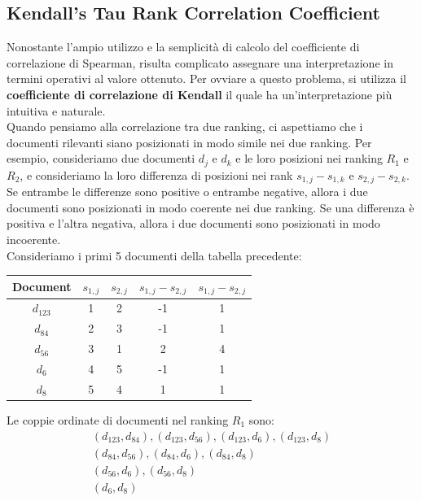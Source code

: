 \documentclass{report}
\begin{document}
	\subsection{Kendall's Tau Rank Correlation Coefficient}
	Nonostante l'ampio utilizzo e la semplicità di calcolo del coefficiente di correlazione di Spearman, risulta complicato assegnare una interpretazione in termini operativi al valore ottenuto. Per ovviare a questo problema, si utilizza il \textbf{coefficiente di correlazione di Kendall} il quale ha un'interpretazione più intuitiva e naturale.
	\vspace{\baselineskip}\\
	Quando pensiamo alla correlazione tra due ranking, ci aspettiamo che i documenti rilevanti siano posizionati in modo simile nei due ranking. Per esempio, consideriamo due documenti $d_j$ e $d_k$ e le loro posizioni nei ranking $R_1$ e $R_2$, e consideriamo la loro differenza di posizioni nei rank $s_{1,j} - s_{1,k}$ e $s_{2,j} - s_{2,k}$. Se entrambe le differenze sono positive o entrambe negative, allora i due documenti sono posizionati in modo coerente nei due ranking. Se una differenza è positiva e l'altra negativa, allora i due documenti sono posizionati in modo incoerente. 
	\vspace{\baselineskip}\\
	Consideriamo i primi 5 documenti della tabella precedente:
	\begin{table}
		\centering
		\begin{tabular}{|c|c|c|c|c|}
			\hline
			\textbf{Document} & \textbf{$s_{1,j}$} & \textbf{$s_{2,j}$} & \textbf{$s_{1,j} - s_{2,j}$} & \textbf{$s_{1,j} - s_{2,j}$}\\ 
			\hline
			$d_123$ & 1 & 2 & -1 & 1\\
			$d_84$ & 2 & 3 & -1 & 1\\
			$d_56$ & 3 & 1 & 2 & 4\\
			$d_6$ & 4 & 5 & -1 & 1\\
			$d_8$ & 5 & 4 & 1 & 1\\
			\hline
		\end{tabular}
	\end{table}
	Le coppie ordinate di documenti nel ranking $R_1$ sono:
	\[
		\begin{array}{l}
			(d_123, d_84), (d_123, d_56), (d_123, d_6), (d_123, d_8) \\
			(d_84, d_56), (d_84, d_6), (d_84, d_8) \\
			(d_56, d_6), (d_56, d_8) \\
			(d_6, d_8)
		\end{array}
	\]
\end{document}
